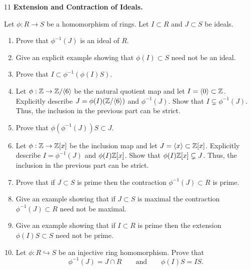\documentclass[Notebook.tex]{subfiles}
\begin{document}
\begin{problem}{11}
	\textbf{Extension and Contraction of Ideals.} 
	
	Let $\phi:R \to S$ be a homomorphism of rings. Let $I \subset R$ and $J \subset S$ be ideals.
	\begin{enumerate}
		\item Prove that $\phi^{-1}(J)$ is an ideal of $R$. 
		\item Give an explicit example showing that $\phi(I) \subset S$ need not be an ideal. 
		\item Prove that $I \subset \phi^{-1}(\phi(I)S)$.
		\item Let $\phi:\mathbb Z \to \mathbb Z/\langle 6\rangle$ be the natural quotient map and let $I=\langle 0\rangle \subset \mathbb Z$. Explicitly describe $J=\phi(I)(\mathbb Z/\langle 6\rangle)$ and $\phi^{-1}(J)$.  Show that $I \subsetneq \phi^{-1}(J)$. Thus, the inclusion in the previous part can be strict.
		\item Prove that $\phi(\phi^{-1}(J))S \subset J$.
		\item Let $\phi:\mathbb Z\to \mathbb Z[x]$ be the inclusion map and let $J=\langle x\rangle \subset \mathbb Z[x]$. Explicitly describe $I=\phi^{-1}(J)$ and $\phi(I)\mathbb Z[x]$. Show that $\phi(I)\mathbb Z[x] \subsetneq J$. Thus, the inclusion in the previous part can be strict.
		\item Prove that if $J \subset S$ is prime then the contraction $\phi^{-1}(J) \subset R$ is prime. 
		\item Give an example showing that if $J \subset S$ is maximal the contraction $\phi^{-1}(J) \subset R$ need not be maximal.
		\item Give an example showing that if $I \subset R$ is prime then the extension $\phi(I)S \subset S$ need not be prime. 
		\item Let $\phi:R \hookrightarrow S$ be an injective ring homomorphism. Prove that 
		\[
		\phi^{-1}(J)=J\cap R \quad \quad \text{and} \quad \quad \phi(I)S = IS.
		\]
	\end{enumerate}
\end{problem}
\end{document}
